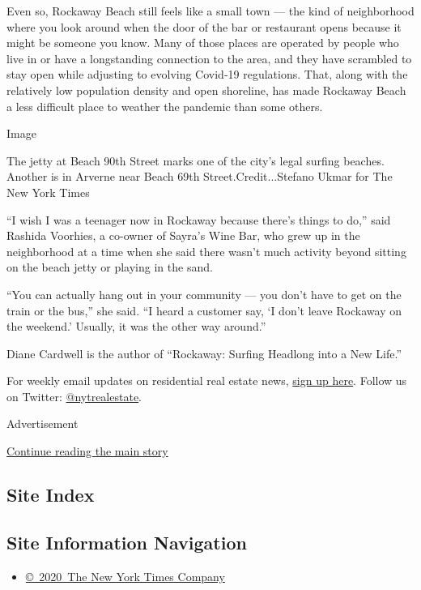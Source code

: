 Even so, Rockaway Beach still feels like a small town --- the kind of
neighborhood where you look around when the door of the bar or
restaurant opens because it might be someone you know. Many of those
places are operated by people who live in or have a longstanding
connection to the area, and they have scrambled to stay open while
adjusting to evolving Covid-19 regulations. That, along with the
relatively low population density and open shoreline, has made Rockaway
Beach a less difficult place to weather the pandemic than some others.

Image

The jetty at Beach 90th Street marks one of the city's legal surfing
beaches. Another is in Arverne near Beach 69th Street.Credit...Stefano
Ukmar for The New York Times

``I wish I was a teenager now in Rockaway because there's things to
do,'' said Rashida Voorhies, a co-owner of Sayra's Wine Bar, who grew up
in the neighborhood at a time when she said there wasn't much activity
beyond sitting on the beach jetty or playing in the sand.

``You can actually hang out in your community --- you don't have to get
on the train or the bus,'' she said. ``I heard a customer say, `I don't
leave Rockaway on the weekend.' Usually, it was the other way around.''

Diane Cardwell is the author of ``Rockaway: Surfing Headlong into a New
Life.''

For weekly email updates on residential real estate news,
\href{http://www.nytimes.com/newsletters/realestate/}{sign up here}.
Follow us on Twitter:
\href{https://twitter.com/nytrealestate}{@nytrealestate}.

Advertisement

\protect\hyperlink{after-bottom}{Continue reading the main story}

\hypertarget{site-index}{%
\subsection{Site Index}\label{site-index}}

\hypertarget{site-information-navigation}{%
\subsection{Site Information
Navigation}\label{site-information-navigation}}

\begin{itemize}
\tightlist
\item
  \href{https://help.nytimes.com/hc/en-us/articles/115014792127-Copyright-notice}{©~2020~The
  New York Times Company}
\end{itemize}

